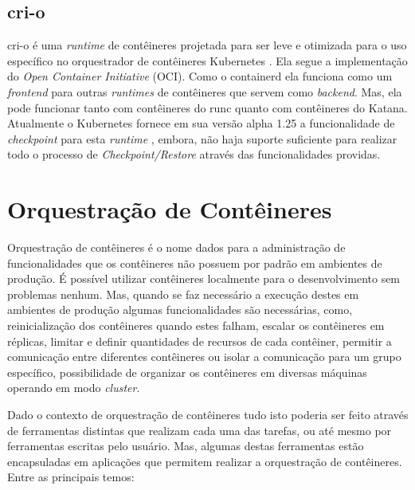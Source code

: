 \subsection{cri-o}

cri-o é uma \textit{runtime} de contêineres projetada para ser leve e otimizada
para o uso específico no orquestrador de contêineres Kubernetes \cite{cri-o}. Ela
segue a implementação do \textit{Open Container Initiative} (OCI). Como o
containerd ela funciona como um \textit{frontend} para outras \textit{runtimes}
de contêineres que servem como \textit{backend}. Mas, ela pode funcionar tanto
com contêineres do runc quanto com contêineres do Katana. Atualmente o Kubernetes
fornece em sua versão alpha 1.25 a funcionalidade de \textit{checkpoint} para
esta \textit{runtime} \cite{kubernetes:checkpoint}, embora, não haja suporte
suficiente para realizar todo o processo de \textit{Checkpoint/Restore} através
das funcionalidades providas.

\section{Orquestração de Contêineres}

Orquestração de contêineres é o nome dados para a administração de funcionalidades
que os contêineres não possuem por padrão em ambientes de produção. É possível
utilizar contêineres localmente para o desenvolvimento sem problemas nenhum. Mas,
quando se faz necessário a execução destes em ambientes de produção algumas
funcionalidades são necessárias, como, reinicialização dos contêineres quando
estes falham, escalar os contêineres em réplicas, limitar e definir quantidades de
recursos de cada contêiner, permitir a comunicação entre diferentes contêineres ou
isolar a comunicação para um grupo específico, possibilidade de organizar os
contêineres em diversas máquinas operando em modo \textit{cluster}.

Dado o contexto de orquestração de contêineres tudo isto poderia ser feito através
de ferramentas distintas que realizam cada uma das tarefas, ou até mesmo por
ferramentas escritas pelo usuário. Mas, algumas destas ferramentas estão encapsuladas
em aplicações que permitem realizar a orquestração de contêineres. Entre as principais
temos:

